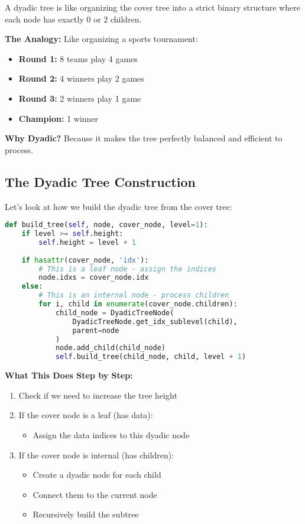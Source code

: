 \documentclass[12pt]{article}
\begin{document}
A dyadic tree is like organizing the cover tree into a strict binary structure where each node has exactly 0 or 2 children.

\textbf{The Analogy:} Like organizing a sports tournament:
\begin{itemize}
    \item \textbf{Round 1:} 8 teams play 4 games
    \item \textbf{Round 2:} 4 winners play 2 games
    \item \textbf{Round 3:} 2 winners play 1 game
    \item \textbf{Champion:} 1 winner
\end{itemize}

\textbf{Why Dyadic?} Because it makes the tree perfectly balanced and efficient to process.

\subsection{The Dyadic Tree Construction}

Let's look at how we build the dyadic tree from the cover tree:

\begin{lstlisting}[language=Python, basicstyle=\small]
def build_tree(self, node, cover_node, level=1):
    if level >= self.height:
        self.height = level + 1
    
    if hasattr(cover_node, 'idx'):
        # This is a leaf node - assign the indices
        node.idxs = cover_node.idx
    else:
        # This is an internal node - process children
        for i, child in enumerate(cover_node.children):
            child_node = DyadicTreeNode(
                DyadicTreeNode.get_idx_sublevel(child), 
                parent=node
            )
            node.add_child(child_node)
            self.build_tree(child_node, child, level + 1)
\end{lstlisting}

\textbf{What This Does Step by Step:}
\begin{enumerate}
    \item Check if we need to increase the tree height
    \item If the cover node is a leaf (has data):
    \begin{itemize}
        \item Assign the data indices to this dyadic node
    \end{itemize}
    \item If the cover node is internal (has children):
    \begin{itemize}
        \item Create a dyadic node for each child
    \item Connect them to the current node
    \item Recursively build the subtree
    \end{itemize}
\end{enumerate}
\end{document}
